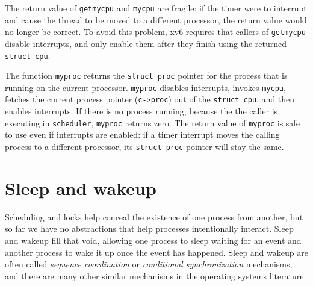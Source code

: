 The return value of
\lstinline{getmycpu}
and
\lstinline{mycpu}
are fragile: if the timer were to interrupt and cause
the thread to be moved to a different processor, the
return value would no longer be correct.
To avoid this problem, xv6 requires that callers of
\lstinline{getmycpu}
disable interrupts, and only enable
them after they finish using the returned
\lstinline{struct cpu}.

The function
\lstinline{myproc}
returns the
\lstinline{struct proc}
pointer
for the process that is running on the current processor.
\lstinline{myproc}
disables interrupts, invokes
\lstinline{mycpu},
fetches the current process pointer
(\lstinline{c->proc})
out of the
\lstinline{struct cpu},
and then enables interrupts.
If there is no process running, because the the caller is
executing in
\lstinline{scheduler},
\lstinline{myproc}
returns zero.
The return value of
\lstinline{myproc}
is safe to use even if interrupts are enabled:
if a timer interrupt moves the calling process to a
different processor, its
\lstinline{struct proc}
pointer will stay the same.
\section{Sleep and wakeup}

Scheduling and locks help conceal the existence of one process
from another,
but so far we have no abstractions that help
processes intentionally interact.
Sleep and wakeup fill that void, allowing one process to 
sleep waiting for an event and another process to wake it up
once the event has happened.
Sleep and wakeup are often called 
\textit{sequence coordination}
or 
\textit{conditional synchronization}
mechanisms, and there are many other similar mechanisms
in the operating systems literature.

